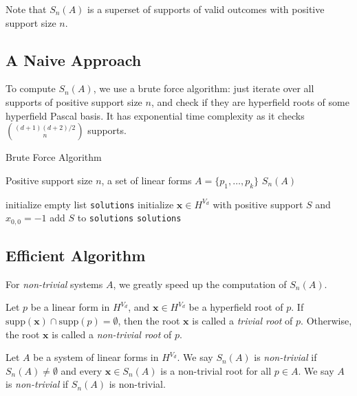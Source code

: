 Note that $S_{n}(A)$ is a superset of supports of valid outcomes with positive support size $n$.

\subsection*{A Naive Approach}

To compute $S_{n}(A)$, we use a brute force algorithm: just iterate over all supports of positive support size $n$, and check if they are hyperfield roots of some hyperfield Pascal basis. It has exponential time complexity as it checks \( \binom{(d+1)(d+2)/2}{n} \) supports.

\begin{algorithm}
\caption{Brute Force Algorithm}\label{alg:hyperfield_criterion:brute_force}
    \begin{algorithmic}[1]
    \Require Positive support size $n$, a set of linear forms $A = \{ p_{1}, \dots, p_{k} \}$
    \Ensure $S_{n}(A)$

    \State initialize empty list \texttt{solutions}
        \State initialize $\mathbf{x} \in H^{V_{d}}$ with positive support $S$ and $x_{0,0} = -1$ 
        \State add $S$ to \texttt{solutions}
        \EndIf
    \EndFor
    \State \Return \texttt{solutions}
    \EndFunction
    \end{algorithmic}  
\end{algorithm}

\subsection*{Efficient Algorithm}

For \emph{non-trivial} systems \( A \), we greatly speed up the computation of $S_{n}(A)$.


\begin{definition}
    Let $p$ be a linear form in \( H^{V_d} \), and $\mathbf{x} \in {H}^{V_d}$ be a hyperfield root of $p$. If $\mathrm{supp}(\mathbf{x}) \cap \mathrm{supp}(p) = \emptyset$, then the root $\mathbf{x}$ is called a \emph{trivial root} of $p$. Otherwise, the root $\mathbf{x}$ is called a \emph{non-trivial root} of $p$.
\end{definition}

\begin{definition}
    Let $A$ be a system of linear forms in \( H^{V_d} \). We say $S_{n}(A)$ is \emph{non-trivial} if $S_{n}(A) \neq \emptyset$ and every $\mathbf{x} \in S_{n}(A)$ is a non-trivial root for all $p \in A$. We say $A$ is \emph{non-trivial} if $S_{n}(A)$ is non-trivial.
\end{definition}
  
